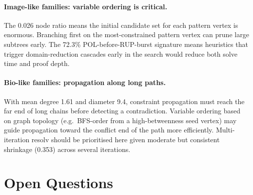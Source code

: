 \documentclass[11pt,a4paper]{article}
\begin{document}
\paragraph{Image-like families: variable ordering is critical.}
The 0.026 node ratio means the initial candidate set for each pattern vertex is enormous.
Branching first on the most-constrained pattern vertex can prune large subtrees early.
The 72.3\% POL-before-RUP-burst signature means heuristics that trigger domain-reduction cascades
early in the search would reduce both solve time and proof depth.

\paragraph{Bio-like families: propagation along long paths.}
With mean degree 1.61 and diameter 9.4, constraint propagation must reach the far end of long
chains before detecting a contradiction.
Variable ordering based on graph topology (e.g.\ BFS-order from a high-betweenness seed vertex)
may guide propagation toward the conflict end of the path more efficiently.
Multi-iteration resolv should be prioritised here given moderate but consistent shrinkage (0.353)
across several iterations.

\section{Open Questions}
\label{sec:open}
\end{document}
